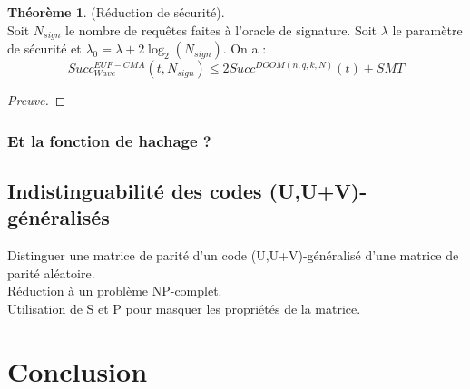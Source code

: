 \documentclass[12pt]{article}
\theoremstyle{definition}
\newtheorem{thm}{Théorème}[section]
\begin{document}
\begin{thm} (Réduction de sécurité). \\
Soit $N_{sign}$ le nombre de requêtes faites à l'oracle de signature. Soit $\lambda$ le paramètre de sécurité et $\lambda_0=\lambda + 2\log_2(N_{sign})$. On a :
$$Succ^{EUF-CMA}_{Wave}(t,N_{sign}) \leq 2Succ^{DOOM(n,q,k,N)}(t) + SMT$$
\end{thm}

\begin{proof}[Preuve]

\end{proof}

\subsubsection{Et la fonction de hachage ?}

\subsection{Indistinguabilité des codes (U,U+V)-généralisés}
Distinguer une matrice de parité d'un code (U,U+V)-généralisé d'une matrice de parité aléatoire. \\
Réduction à un problème NP-complet. \\
Utilisation de S et P pour masquer les propriétés de la matrice. \\

\section*{Conclusion}

\newpage




\end{document}
